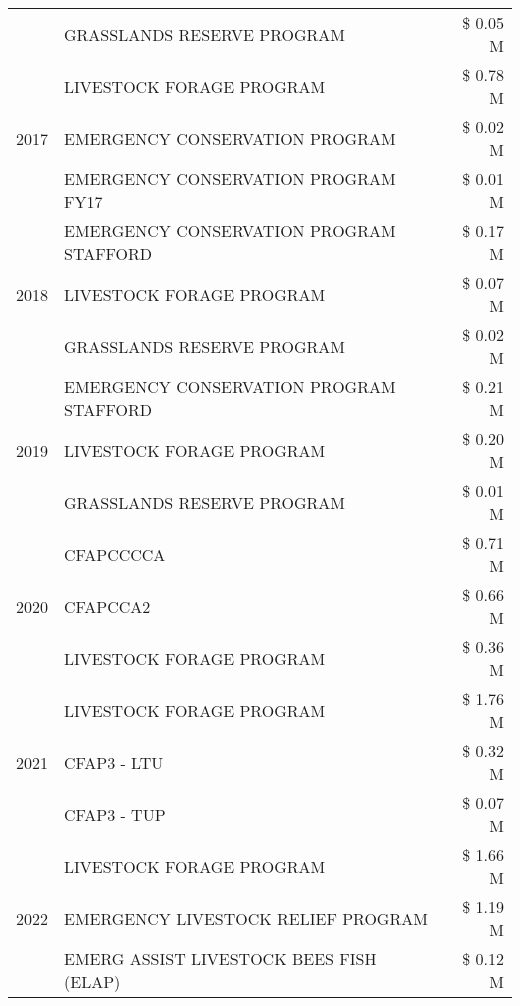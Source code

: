 \begin{tabular}{llr}
 & GRASSLANDS RESERVE PROGRAM & \$ 0.05 M \\
\cline{1-3}
\multirow[t]{3}{*}{2017} & LIVESTOCK FORAGE PROGRAM & \$ 0.78 M \\
 & EMERGENCY CONSERVATION PROGRAM & \$ 0.02 M \\
 & EMERGENCY CONSERVATION PROGRAM FY17 & \$ 0.01 M \\
\cline{1-3}
\multirow[t]{3}{*}{2018} & EMERGENCY CONSERVATION PROGRAM STAFFORD & \$ 0.17 M \\
 & LIVESTOCK FORAGE PROGRAM & \$ 0.07 M \\
 & GRASSLANDS RESERVE PROGRAM & \$ 0.02 M \\
\cline{1-3}
\multirow[t]{3}{*}{2019} & EMERGENCY CONSERVATION PROGRAM STAFFORD & \$ 0.21 M \\
 & LIVESTOCK FORAGE PROGRAM & \$ 0.20 M \\
 & GRASSLANDS RESERVE PROGRAM & \$ 0.01 M \\
\cline{1-3}
\multirow[t]{3}{*}{2020} & CFAPCCCCA & \$ 0.71 M \\
 & CFAPCCA2 & \$ 0.66 M \\
 & LIVESTOCK FORAGE PROGRAM & \$ 0.36 M \\
\cline{1-3}
\multirow[t]{3}{*}{2021} & LIVESTOCK FORAGE PROGRAM & \$ 1.76 M \\
 & CFAP3 - LTU & \$ 0.32 M \\
 & CFAP3 - TUP & \$ 0.07 M \\
\cline{1-3}
\multirow[t]{3}{*}{2022} & LIVESTOCK FORAGE PROGRAM & \$ 1.66 M \\
 & EMERGENCY LIVESTOCK RELIEF PROGRAM & \$ 1.19 M \\
 & EMERG ASSIST LIVESTOCK BEES FISH (ELAP) & \$ 0.12 M \\
\cline{1-3}
\bottomrule
\end{tabular}

